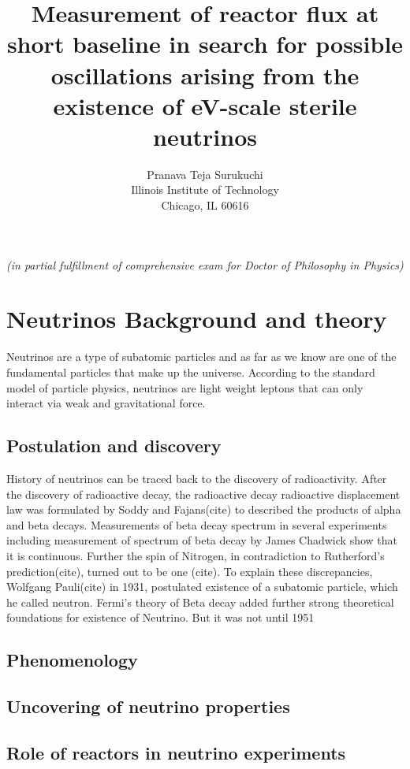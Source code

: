 \documentclass[11pt]{article}
\author{Pranava Teja Surukuchi \\ Illinois Institute of Technology\\ Chicago, IL 60616}
\title{Measurement of reactor flux at short baseline in search for possible oscillations arising from the existence of eV-scale sterile neutrinos}
\date{\displaydate{date}}
\begin{document}
\maketitle
\begin{center}
\textit{(in partial fulfillment of comprehensive exam for Doctor of Philosophy in Physics)}
\end{center}
\newpage

\tableofcontents

\section{Neutrinos Background and theory}
Neutrinos are a type of subatomic particles and as far as we know are one of the fundamental particles that make up the universe. According to the standard model of particle physics, neutrinos are light weight leptons that can only interact via weak and gravitational force. 	

\subsection{Postulation and discovery}
History of neutrinos can be traced back to the discovery of radioactivity. After the discovery of radioactive decay,  the radioactive decay radioactive displacement law was formulated by Soddy and Fajans(cite) to described the products of alpha and beta decays. Measurements of beta decay spectrum in several experiments including measurement of spectrum of beta decay by James Chadwick show that it is continuous. Further the spin of Nitrogen, in contradiction to Rutherford's prediction(cite), turned out to be one (cite). To explain these discrepancies, Wolfgang Pauli(cite) in 1931, postulated existence of a subatomic particle, which he called neutron. Fermi's theory of Beta decay added further strong theoretical foundations for existence of Neutrino. But it was not until 1951 

\subsection{Phenomenology}


\subsection{Uncovering of neutrino properties}

\subsection{Role of reactors in neutrino experiments}
\end{document}
